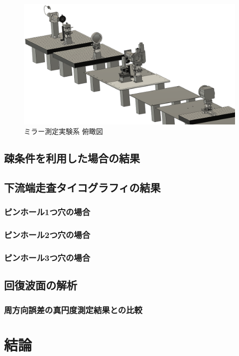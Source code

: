 \documentclass[dvipdfmx,autodetect-engine]{jreport}
\begin{document}
\begin{figure}[h!]
\centering
\includegraphics[scale=0.25]{images/mirror_experiment/setup/asm_total_isometric.png}
\caption{ミラー測定実験系 俯瞰図}
\label{fig:mirror_experiment_asm_cad_isometric}
\end{figure}

\section{疎条件を利用した場合の結果}

\section{下流端走査タイコグラフィの結果}
\subsection{ピンホール1つ穴の場合}
\subsection{ピンホール2つ穴の場合}
\subsection{ピンホール3つ穴の場合}

\section{回復波面の解析}
\subsection{周方向誤差の真円度測定結果との比較}

\newpage
\chapter{結論}
\minitoc
\end{document}
